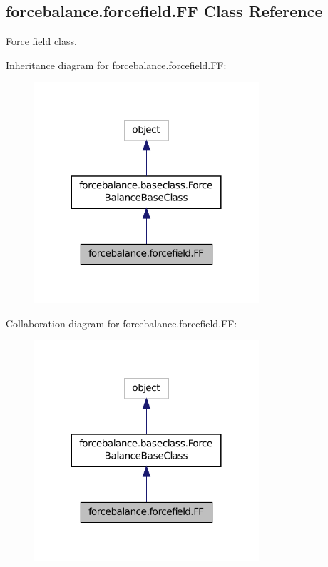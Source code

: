 \hypertarget{classforcebalance_1_1forcefield_1_1FF}{\subsection{forcebalance.\-forcefield.\-F\-F Class Reference}
\label{classforcebalance_1_1forcefield_1_1FF}
}


Force field class.  




Inheritance diagram for forcebalance.\-forcefield.\-F\-F\-:\nopagebreak
\begin{figure}[H]
\begin{center}
\leavevmode
\includegraphics[width=236pt]{classforcebalance_1_1forcefield_1_1FF__inherit__graph}
\end{center}
\end{figure}


Collaboration diagram for forcebalance.\-forcefield.\-F\-F\-:\nopagebreak
\begin{figure}[H]
\begin{center}
\leavevmode
\includegraphics[width=236pt]{classforcebalance_1_1forcefield_1_1FF__coll__graph}
\end{center}
\end{figure}
